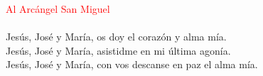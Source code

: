\documentclass[9pt]{article}
\begin{document}
\begin{multicols}{2}
      \textcolor{red}{Al Arcángel San Miguel}\\
      \\[1mm]
      Jesús, José y María, os doy el corazón y alma mía.\\
      Jesús, José y María, asistidme en mi última agonía.\\
      Jesús, José y María, con vos descanse en paz el alma mía.\\[2mm]
      \\
      \\[2mm]
      
\end{multicols}
\end{document}
